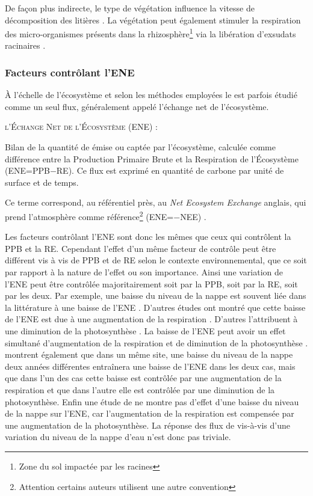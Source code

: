 De façon plus indirecte, le type de végétation influence la vitesse de décomposition des litières \citep{hobbie1996,liu2000,gogo2015}.
La végétation peut également stimuler la respiration des micro-organismes présents dans la rhizosphère\footnote{Zone du sol impactée par les racines} via la libération d'exsudats racinaires \citep{moore2002}.

\subsubsection{Facteurs contrôlant l'ENE}

À l'échelle de l'écosystème et selon les méthodes employées le \coo est parfois étudié comme un seul flux, généralement appelé l'échange net de l'écosystème.

\begin{pdef}
\textsc{l'Échange Net de l'Écosystème (ENE)} :

Bilan de la quantité de \coo émise ou captée par l'écosystème, calculée comme  différence entre la Production Primaire Brute et la Respiration de l'Écosystème (ENE=PPB$-$RE).
Ce flux est exprimé en quantité de carbone par unité de surface et de temps.
\end{pdef}
Ce terme correspond, au référentiel près, au \textit{Net Ecosystem Exchange} anglais, qui prend l'atmosphère comme référence\footnote{Attention certains auteurs utilisent une autre convention} (ENE=$-$NEE) \citep{chapin2006}.

Les facteurs contrôlant l'ENE sont donc les mêmes que ceux qui contrôlent la PPB et la RE.
Cependant l'effet d'un même facteur de contrôle peut être différent vis à vis de PPB et de RE selon le contexte environnemental, que ce soit par rapport à la nature de l'effet ou son importance.
Ainsi une variation de l'ENE peut être contrôlée majoritairement soit par la PPB, soit par la RE, soit par les deux.
Par exemple, une baisse du niveau de la nappe est souvent liée dans la littérature à une baisse de l'ENE \citep{aurela2007,peichl2014}.
D'autres études ont montré que cette baisse de l'ENE est due à une augmentation de la respiration \citep{alm1999, ise2008}.
D'autres l'attribuent à une diminution de la photosynthèse \citep{sonnentag2010,peichl2014}.
La baisse de l'ENE peut avoir un effet simultané d'augmentation de la respiration et de diminution de la photosynthèse \citep{strack2013}.
\citet{lund2012} montrent également que dans un même site, une baisse du niveau de la nappe deux années différentes entraînera une baisse de l'ENE dans les deux cas, mais que dans l'un des cas cette baisse est contrôlée par une augmentation de la respiration et que dans l'autre elle est contrôlée par une diminution de la photosynthèse.
Enfin une étude de \citet{ballantyne2014} ne montre pas d'effet d'une baisse du niveau de la nappe sur l'ENE, car l'augmentation de la respiration est compensée par une augmentation de la photosynthèse.
La réponse des flux de \coo vis-à-vis d'une variation du niveau de la nappe d'eau n'est donc pas triviale.

